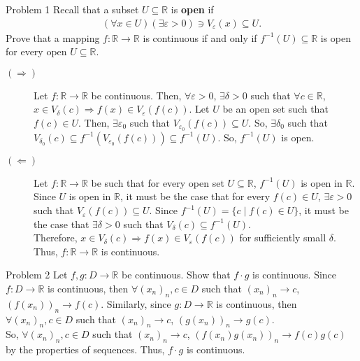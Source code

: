 \documentclass[10pt]{extarticle}
\title{}
\author{}
\date{}
\newcommand{\R}{\mathbb{R}}
\begin{document}
  \begin{problem}{Problem 1}
    Recall that a subset $U\subseteq \R$ is \textbf{open} if
    \begin{align*}
      (\forall x\in U)(\exists \varepsilon > 0) \ni V_{\varepsilon}(x) \subseteq U.
    \end{align*}
    Prove that a mapping $f: \R \rightarrow \R$ is continuous if and only if $f^{-1}(U) \subseteq \R$ is open for every open $U\subseteq \R$. 
    \tcblower
    \begin{description}
      \item[$(\Rightarrow)$] Let $f: \R \rightarrow \R$ be continuous. Then, $\forall \varepsilon > 0$, $\exists \delta > 0$ such that  $\forall c\in\R$, $x\in V_{\delta}(c) \Rightarrow f(x) \in V_{\varepsilon}(f(c))$. Let $U$ be an open set such that $f(c)\in U$. Then, $\exists \varepsilon_{0}$ such that $V_{\varepsilon_0}(f(c))\subseteq U$. So, $\exists \delta_0$ such that $V_{\delta_0}(c) \subseteq f^{-1}(V_{\varepsilon_0}(f(c)))\subseteq f^{-1}(U)$. So, $f^{-1}(U)$ is open.
      \item[$(\Leftarrow)$] Let $f: \R \rightarrow \R$ be such that for every open set $U\subseteq \R$, $f^{-1}(U)$ is open in $\R$.\\

        Since $U$ is open in $\R$, it must be the case that for every $f(c)\in U$, $\exists \varepsilon > 0$ such that $V_{\varepsilon}(f(c))\subseteq U$. Since $f^{-1}(U) = \{c\mid f(c)\in U\}$, it must be the case that $\exists \delta > 0$ such that $V_{\delta}(c) \subseteq f^{-1}(U)$.\\

        Therefore, $x\in V_{\delta}(c) \Rightarrow f(x)\in V_{\varepsilon}(f(c))$ for sufficiently small $\delta$. Thus, $f: \R \rightarrow \R$ is continuous.
    \end{description}
  \end{problem}
  \begin{problem}{Problem 2}
    Let $f,g: D\rightarrow \R$ be continuous. Show that $f\cdot g$ is continuous.
    \tcblower
    Since $f: D\rightarrow \R$ is continuous, then $\forall (x_n)_n,c\in D$ such that $(x_n)_n \rightarrow c$, $\left(f(x_n)\right)_n \rightarrow f(c)$. Similarly, since $g: D\rightarrow \R$ is continuous, then $\forall (x_n)_n,c\in D$ such that $(x_n)_n\rightarrow c$, $(g(x_n))_n \rightarrow g(c)$.\\

    So, $\forall (x_n)_n,c\in D$ such that $(x_n)_n \rightarrow c$, $(f(x_n)g(x_n))_n \rightarrow f(c)g(c)$ by the properties of sequences. Thus, $f\cdot g$ is continuous.
  \end{problem}
\end{document}
